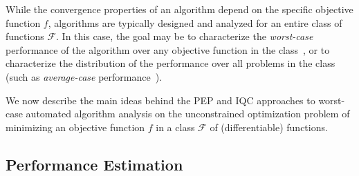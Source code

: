 \documentclass{juliacon}
\def\F{\mathcal{F}}
\begin{document}
While the convergence properties of an algorithm depend on the specific objective function $f$, algorithms are typically designed and analyzed for an entire class of functions $\F$. In this case, the goal may be to characterize the \textit{worst-case} performance of the algorithm over any objective function in the class~\cite{rmm}, or to characterize the distribution of the performance over all problems in the class (such as \textit{average-case} performance~\cite{robey-chamon-pappas-hassani2022}).

We now describe the main ideas behind the PEP and IQC approaches to worst-case automated algorithm analysis on the unconstrained optimization problem of minimizing an objective function $f$ in a class $\F$ of (differentiable) functions.

\subsection{Performance Estimation}
\end{document}
